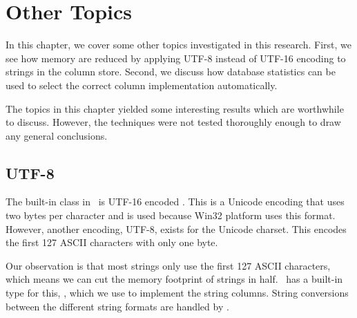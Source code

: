 \chapter{Other Topics}
\label{chap:misc}
In this chapter, we cover some other topics investigated in this research. First, we see how memory are reduced by applying UTF-8 instead of UTF-16 encoding to strings in the column store. Second, we discuss how database statistics can be used to select the correct column implementation automatically.

The topics in this chapter yielded some interesting results which are worthwhile to discuss. However, the techniques were not tested thoroughly enough to draw any general conclusions.

\clearpage

\section{UTF-8}
\label{sec:UTF-8}
The built-in  class in \delphi~is UTF-16 encoded \cite{noauthor_undated-cp}. This is a Unicode encoding that uses two bytes per character and is used because Win32 platform uses this format. However, another encoding, UTF-8, exists for the Unicode charset. This encodes the first 127 ASCII characters with only one byte. 

Our observation is that most strings only use the first 127 ASCII characters, which means we can cut the memory footprint of strings in half. \delphi~has a built-in type for this, , which we use to implement the string columns. String conversions between the different string formats are handled by \delphi.

